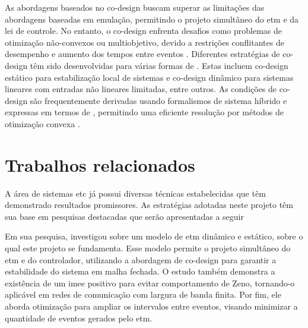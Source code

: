 As abordagens baseados no co-design buscam superar as limitações das abordagens baseadas em emulação, permitindo o projeto simultâneo do \acrshort{etm} e da lei de controle. No entanto, o co-design enfrenta desafios como problemas de otimização não-convexos ou multiobjetivo, devido a restrições conflitantes de desempenho e aumento dos tempos entre eventos \cite{coutinho2021}. Diferentes estratégias de co-design têm sido desenvolvidas para várias formas de . Estas incluem co-design estático para estabilização local de sistemas  e co-design dinâmico para sistemas lineares com entradas não lineares limitadas, entre outros. As condições de co-design são frequentemente derivadas usando formalismos de sistema híbrido e expressas em termos de , permitindo uma eficiente resolução por métodos de otimização convexa \cite{coutinho2021}.

\section{Trabalhos relacionados}

A área de sistemas \acrshort{etc} já possui diversas técnicas estabelecidas que têm demonstrado resultados promissores. As estratégias adotadas neste projeto têm sua base em pesquisas destacadas que serão apresentadas a seguir

Em sua pesquisa, \cite{coutinho2021} investigou sobre um modelo de \acrshort{etm} dinâmico e estático, sobre o qual este projeto se fundamenta. Esse modelo permite o projeto simultâneo do \acrshort{etm} e do controlador, utilizando a abordagem de co-design para garantir a estabilidade do sistema em malha fechada. O estudo também demonstra a existência de um \acrfull{imee} positivo para evitar comportamento de Zeno, tornando-o aplicável em redes de comunicação com largura de banda finita. Por fim, ele aborda otimização para ampliar os intervalos entre eventos, visando minimizar a quantidade de eventos gerados pelo \acrshort{etm}.


